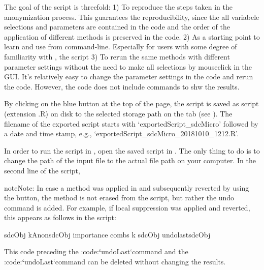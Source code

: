 \documentclass[letterpaper,10pt,english]{sphinxmanual}
\begin{document}
The goal of the  script is threefold:
1) To reproduce the steps taken in the anonymization process. This guarantees
the reproducibility, since the all variabele selections and parameters are contained in the
code and the order of the application of different methods is preserved in the code.
2) As a starting point to learn  and use  from  command-line. Especially for
users with some degree of familiarity with , the script
3) To rerun the same methods with different parameter settings without the need to make
all selections by mouseclick in the GUI. It’s relatively easy to change the parameter settings
in the  code and rerun the code. However, the code does not include commands to shw
the results.

By clicking on the blue button  at the top of the page, the script
is saved as  script (extension .R) on disk to the selected storage path on the
 tab (see ).
The filename of the exported script starts with ‘exportedScript\_sdcMicro’ followed
by a date and time stamp, e.g., ‘exportedScript\_sdcMicro\_20181010\_1212.R’.

In order to run the script in , open the saved script in . The only
thing to do is to change the path of the input file to the actual file path on your computer.
In the second line of the  script,

\begin{sphinxadmonition}{note}{Note:}
In case a method was applied in  and subsequently reverted by using the 
button, the method is not erased from the script, but rather the undo command is added.
For example, if local suppression was applied and reverted, this appears as follows in
the script:

%
\begin{sphinxVerbatim}[commandchars=\\\{\},numbers=left,firstnumber=1,stepnumber=1]
sdcObj  kAnonsdcObj importance combs k
sdcObj  undolastsdcObj
\end{sphinxVerbatim}

This code preceding the :code:{\color{red}\bfseries{}{}`}undoLast{}`command and the :code:{\color{red}\bfseries{}{}`}undoLast{}`command
can be deleted without changing the results.
\end{sphinxadmonition}
\end{document}
